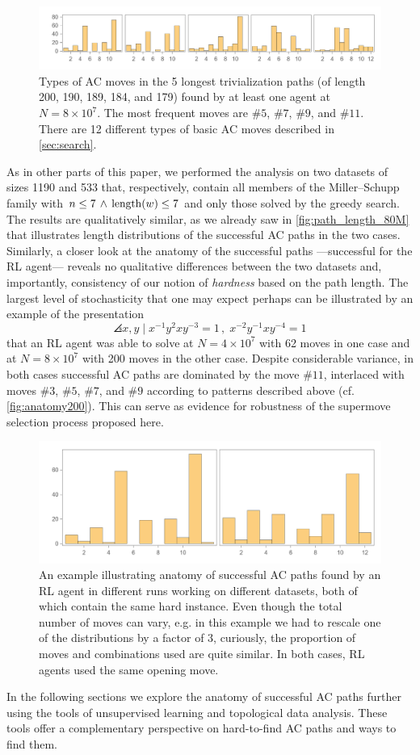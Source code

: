 \begin{figure}[h]
	\centering
	\includegraphics[scale=0.6]{fig/anatomy_some.png}
	\caption{Types of AC moves in the 5 longest trivialization paths (of length 200, 190, 189, 184, and 179) found by at least one agent at $N=8 \times 10^7$. The most frequent moves are $\# 5$, $\# 7$, $\# 9$, and $\# 11$. There are 12 different types of basic AC moves described in \autoref{sec:search}.}
	\label{fig:anatomy_some}
\end{figure}

As in other parts of this paper, we performed the analysis on two datasets of sizes 1190 and 533 that, respectively, contain all members of the Miller–Schupp family with $n \leq 7 \, \land \, \operatorname{length}(w) \leq 7$ and only those solved by the greedy search. The results are qualitatively similar, as we already saw in \autoref{fig:path_length_80M} that illustrates length distributions of the successful AC paths in the two cases. Similarly, a closer look at the anatomy of the successful paths ---successful for the RL agent--- reveals no qualitative differences between the two datasets and, importantly, consistency of our notion of \textit{hardness} based on the path length. The largest level of stochasticity that one may expect perhaps can be illustrated by an example of the presentation
\[
\angles{x, y \mid x^{-1} y^2 x y^{-3} = 1 \,, \; x^{-2} y^{-1} x y^{-4} = 1}
\]
that an RL agent was able to solve at $N = 4 \times 10^7$ with 62 moves in one case and at $N = 8 \times 10^7$ with 200 moves in the other case. Despite considerable variance, in both cases successful AC paths are dominated by the move $\# 11$, interlaced with moves $\# 3$, $\# 5$, $\# 7$, and $\# 9$ according to patterns described above (cf. \autoref{fig:anatomy200}). This can serve as evidence for robustness of the supermove selection process proposed here.

\begin{figure}[h]
	\centering
	\includegraphics[scale=0.55]{fig/anatomy200.png}
	\caption{An example illustrating anatomy of successful AC paths found by an RL agent in different runs working on different datasets, both of which contain the same hard instance. Even though the total number of moves can vary, e.g. in this example we had to rescale one of the distributions by a factor of 3, curiously, the proportion of moves and combinations used are quite similar. In both cases, RL agents used the same opening move.}
	\label{fig:anatomy200}
\end{figure}

In the following sections we explore the anatomy of successful AC paths further using the tools of unsupervised learning and topological data analysis. These tools offer a complementary perspective on hard-to-find AC paths and ways to find them.
